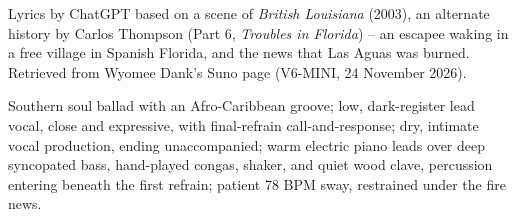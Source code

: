
\begin{notes}
Lyrics by ChatGPT based on a scene of \emph{British Louisiana} (2003), an alternate history by Carlos Thompson (Part 6, \emph{Troubles in Florida}) -- an escapee waking in a free village in Spanish Florida, and the news that Las Aguas was burned. Retrieved from Wyomee Dank's Suno page (V6-MINI, 24 November 2026).
\end{notes}
\begin{style}
Southern soul ballad with an Afro-Caribbean groove; low, dark-register lead vocal, close and expressive, with final-refrain call-and-response; dry, intimate vocal production, ending unaccompanied; warm electric piano leads over deep syncopated bass, hand-played congas, shaker, and quiet wood clave, percussion entering beneath the first refrain; patient 78 BPM sway, restrained under the fire news.
\end{style}
